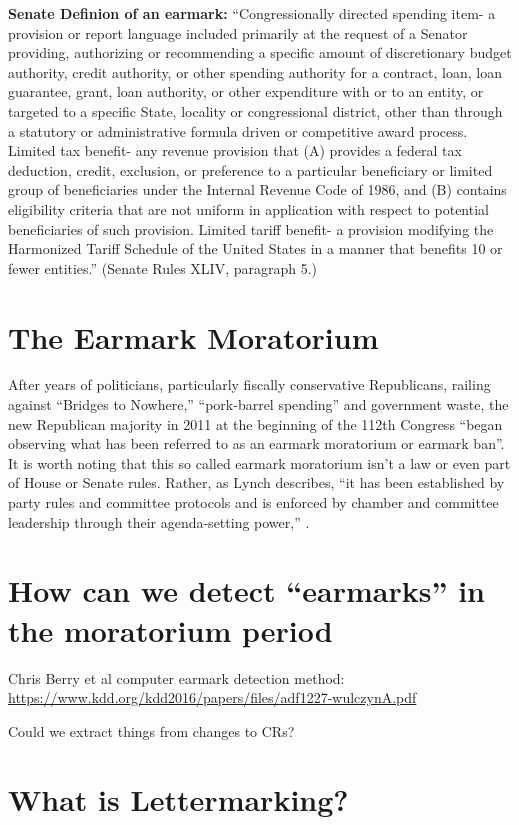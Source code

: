 \documentclass{article}
\begin{document}
\textbf{Senate Definion of an earmark:} ``Congressionally directed spending item- a provision or
report language included primarily at the request of a
Senator providing, authorizing or recommending a
specific amount of discretionary budget authority,
credit authority, or other spending authority for a
contract, loan, loan guarantee, grant, loan authority, or
other expenditure with or to an entity, or targeted to a
specific State, locality or congressional district, other
than through a statutory or administrative formula
driven or competitive award process.
Limited tax benefit- any revenue provision that (A)
provides a federal tax deduction, credit, exclusion, or
preference to a particular beneficiary or limited group
of beneficiaries under the Internal Revenue Code of
1986, and (B) contains eligibility criteria that are not
uniform in application with respect to potential
beneficiaries of such provision.
Limited tariff benefit- a provision modifying the
Harmonized Tariff Schedule of the United States in a
manner that benefits 10 or fewer entities.'' (Senate Rules XLIV, paragraph 5.)

\section{The Earmark Moratorium}

After years of politicians, particularly fiscally conservative Republicans, railing against ``Bridges to Nowhere,'' ``pork-barrel spending'' and government waste, the new Republican majority in 2011 at the beginning of the 112th Congress ``began observing what has been referred to as an earmark moratorium or earmark ban''\citep[pg. 1.]{Lynch2018CRS}.  It is worth noting that this so called earmark moratorium isn't a law or even part of House or Senate rules.  Rather, as Lynch describes, ``it has been established by party rules and committee protocols and is enforced by chamber and committee leadership through their agenda-setting power,'' \citep[pg. 1.]{Lynch2018CRS}.


\section{How can we detect ``earmarks'' in the moratorium period}
Chris Berry et al computer earmark detection method: \url{https://www.kdd.org/kdd2016/papers/files/adf1227-wulczynA.pdf}

Could we extract things from changes to CRs? 

\section{What is Lettermarking?}
\end{document}

